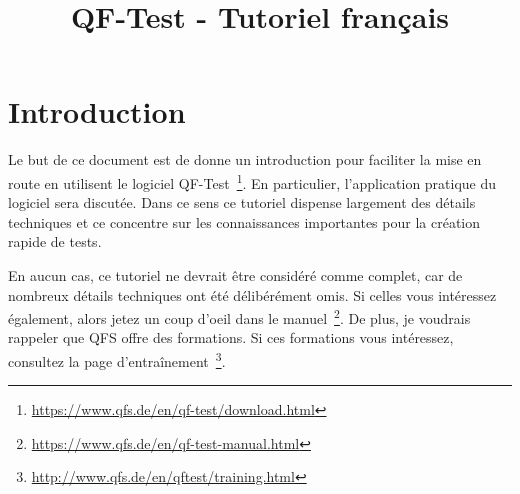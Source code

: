 \documentclass{article}
\begin{document}
\title{QF-Test - Tutoriel français}
\maketitle
\newpage

\tableofcontents
\newpage

\section{Introduction}
\par{
Le but de ce document est de donne un introduction pour faciliter la mise en route en utilisent le logiciel
QF-Test~\footnote{\url{https://www.qfs.de/en/qf-test/download.html}}. En particulier, l'application pratique
du logiciel sera discutée. Dans ce sens ce tutoriel dispense largement des détails techniques et ce concentre
sur les connaissances importantes pour la création rapide de tests.
}
\par{
En aucun cas, ce tutoriel ne devrait être considéré comme complet, car de nombreux détails techniques ont été
délibérément omis. Si celles vous intéressez également, alors jetez un coup d'oeil dans le
manuel~\footnote{\url{https://www.qfs.de/en/qf-test-manual.html}}. De plus, je voudrais rappeler que QFS
offre des formations. Si ces formations vous intéressez, consultez
la page d'entraînement~\footnote{\url{http://www.qfs.de/en/qftest/training.html}}.
}
\newpage
\end{document}
